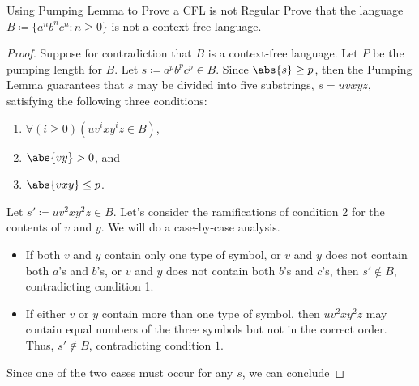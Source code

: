 \begin{exbox}{Using Pumping Lemma to Prove a CFL is not Regular}{}
    Prove that the language $B \coloneq \{ a^n b^n c^n : n \geq 0 \}$ is not a context-free language.
    \tcblower
    \begin{proof}
        Suppose for contradiction that $B$ is a context-free language. Let $P$ be the pumping length for $B$. Let $s \coloneq a^p b^p c^p \in B$. Since $\abs{s} \geq p$, then the Pumping Lemma guarantees that $s$ may be divided into five substrings, $s = uvxyz$, satisfying the following three conditions:
        \begin{enumerate}[noitemsep]
            \item $\forall (i \geq 0) (uv^ixy^iz \in B)$,
            \item $\abs{vy} > 0$, and
            \item $\abs{vxy} \leq p$.
        \end{enumerate}
        Let $s\prime \coloneq uv^2xy^2z \in B$. Let's consider the ramifications of condition 2 for the contents of $v$ and $y$. We will do a case-by-case analysis.
        \begin{itemize}
            \item If both $v$ and $y$ contain only one type of symbol, or $v$ and $y$ does not contain both $a$'s and $b$'s, or $v$ and $y$ does not contain both $b$'s and $c$'s, then $s\prime \notin B$, contradicting condition 1.
            \item If either $v$ or $y$ contain more than one type of symbol, then $uv^2xy^2z$ may contain equal numbers of the three symbols but not in the correct order. Thus, $s\prime \notin B$, contradicting condition $1$.
        \end{itemize}
        Since one of the two cases must occur for any $s$, we can conclude
    \end{proof}
\end{exbox}
